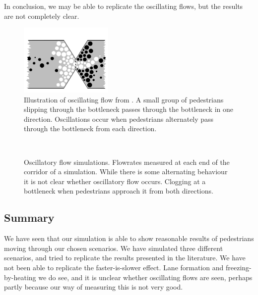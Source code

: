 In conclusion, we may be able to replicate the oscillating flows, but the 
results are not completely clear.

\begin{figure}[h]
    \centering
    \includegraphics[width=0.4\textwidth]{Figures/oscil_flow.png}
    \caption[Illustration of oscillating flow from \cite{oscil}]{Illustration 
    of oscillating flow from \cite{oscil}. A small group of pedestrians 
    slipping through the bottleneck passes through the bottleneck in one 
    direction. Oscillations occur when pedestrians alternately pass through 
    the bottleneck from each direction.}
    \label{fig:oscillitoryflow_litterature}
\end{figure}

\begin{figure}[h]
    \centering
    \\
    
    \caption[Oscillatory flow simulations]{Oscillatory flow simulations. 
     Flowrates measured at each end of the corridor 
    of a simulation. While there is some alternating behaviour it is not clear 
    whether oscillatory flow occurs.  Clogging at a 
    bottleneck when pedestrians approach it from both directions.}
    \label{fig:oscillatory-flow}
\end{figure}

\subsection{Summary}
We have seen that our simulation is able to show reasonable results of 
pedestrians moving through our chosen scenarios. We have simulated three  
different scenarios, and tried to replicate the results presented in the 
literature. We have not been able to replicate the faster-is-slower effect. 
Lane formation and freezing-by-heating we do see, and it is unclear whether 
oscillating flows are seen, perhaps partly because our way of measuring this 
is not very good.
